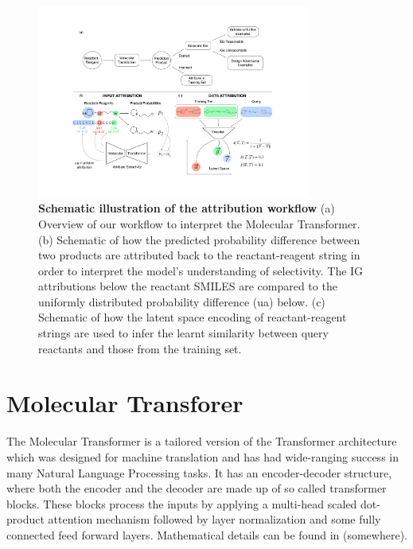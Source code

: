 \begin{figure}[ht!]
    \centering
    \includegraphics[width=0.8\textwidth]{Chapters/Transformer/Figs/workflow.pdf}
    \caption{\label{fig:workflow} \textbf{Schematic illustration of the attribution workflow} (a) Overview of our workflow to interpret the Molecular Transformer. (b) Schematic of how the predicted probability difference between two products are attributed back to the reactant-reagent string in order to interpret the model's understanding of selectivity. The IG attributions below the reactant SMILES are compared to the uniformly distributed probability difference (ua) below. (c) Schematic of how the latent space encoding of reactant-reagent strings are used to infer the learnt similarity between query reactants and those from the training set.}
\end{figure}

\section{Molecular Transforer}
The Molecular Transformer \cite{Schwaller2019MolecularPrediction} is a tailored version of the Transformer architecture \cite{Vaswani2017} which was designed for machine translation and has had wide-ranging success in many Natural Language Processing tasks. It has an encoder-decoder structure, where both the encoder and the decoder are made up of so called transformer blocks. These blocks process the inputs by applying a multi-head scaled dot-product attention mechanism followed by layer normalization and some fully connected feed forward layers. Mathematical details can be found in (somewhere).

